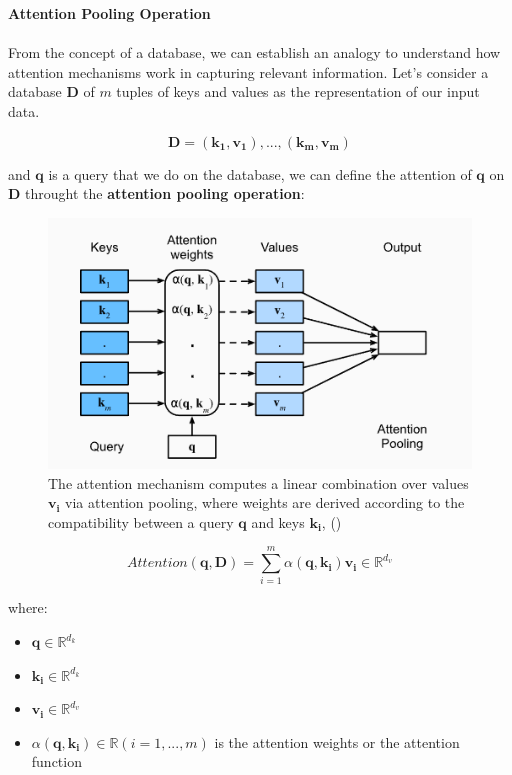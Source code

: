 \textbf{Attention Pooling Operation}
\\\\
From the concept of a database, we can establish an analogy to understand how attention mechanisms work in capturing relevant information. Let's consider a database $\mathbf{D}$ of $m$ tuples of keys and values as the representation of our input data.

\begin{equation}
    \mathbf{D}={(\mathbf{k_1},\mathbf{v_1}),...,(\mathbf{k_m},\mathbf{v_m})}
\end{equation}

and $\mathbf{q}$ is a query that we do on the database, we can define the attention of $\mathbf{q}$ on $\mathbf{D}$ throught the \textbf{attention pooling operation}:

\newpage

\begin{figure}[h!]
    \centering%
    \includegraphics[width=\linewidth]{Figures/background/attention_pooling.png}
    \caption{The attention mechanism computes a linear combination over values $\mathbf{v_{i}}$ via attention pooling, where weights are derived according to the compatibility between a query $\mathbf{q}$ and keys $\mathbf{k_{i}}$, (\cite{goodfellow2016dive})}
    \label{fig:attention}
\end{figure}


\begin{equation}
    Attention(\mathbf{q},\mathbf{D})=\sum_{i=1}^{m} \alpha (\mathbf{q},\mathbf{k_i})\mathbf{v_{i}} \in \mathbb{R}^{d_{v}}
\end{equation}

where:

\begin{itemize}
    \item $\mathbf{q} \in \mathbb{R}^{d_k}$
    \item $\mathbf{k_{i}} \in \mathbb{R}^{d_k}$               
    \item $\mathbf{v_{i}} \in \mathbb{R}^{d_v}$
    \item $\alpha (\mathbf{q},\mathbf{k_{i}}) \in \mathbb{R}(i=1,...,m)$ is the attention weights or the attention function
\end{itemize}

